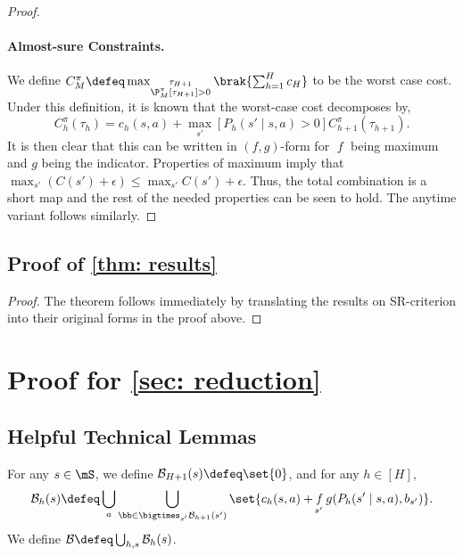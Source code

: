 \documentclass[pdftex, a4paper, 12pt]{article}
\newcommand{\mB}{\mathcal{B}}
\DeclareMathOperator*{\f}{\mathit{f}}
\begin{document}
\begin{proof}
    \paragraph{Almost-sure Constraints.} We define $C_M^{\pi} \defeq \max_{\substack{\tau_{H+1}\\ \P^{\pi}_M[\tau_{H+1}] > 0}}\brak{\sum_{h = 1}^H c_H}$ to be the worst case cost. Under this definition, it is known that the worst-case cost decomposes by,
    \begin{equation}
        C^{\pi}_h(\tau_h) = c_h(s,a) + \max_{s'} [P_h(s' \mid s,a) > 0] C_{h+1}^{\pi}(\tau_{h+1}).
    \end{equation}
    It is then clear that this can be written in $(f,g)$-form for $\f$ being maximum and $g$ being the indicator. Properties of maximum imply that $\max_{s'} (C(s') + \epsilon) \leq \max_{s'} C(s') + \epsilon$. Thus, the total combination is a short map and the rest of the needed properties can be seen to hold. The anytime variant follows similarly.
    
\end{proof}

\subsection{Proof of \texorpdfstring{\cref{thm: results}}{thm: results}}

\begin{proof}
    The theorem follows immediately by translating the results on SR-criterion into their original forms in the proof above.
\end{proof}

\section{Proof for \texorpdfstring{\cref{sec: reduction}}{sec: reduction}}

\subsection{Helpful Technical Lemmas}

\begin{definition}\label{def: value-space}
    For any $s \in \mS$, we define $\mB_{H+1}(s) \defeq \set{0}$, and for any $h \in [H]$,
    \begin{equation}\label{equ: covering-states}
    \displaystyle \mB_h(s) \defeq 
    \displaystyle\bigcup_{a} \bigcup_{\bb \in \bigtimes_{s'} \mB_{h+1}(s')} \set{c_h(s,a) + \f_{s'} g(P_h(s' \mid s,a), b_{s'})}.
\end{equation}
We define $\mB \defeq \bigcup_{h,s} \mB_h(s)$. 
\end{definition}
\end{document}
